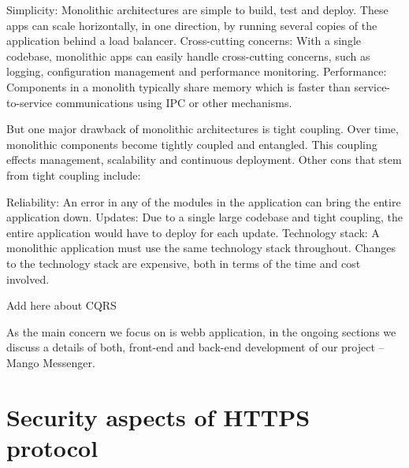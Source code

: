 Simplicity: Monolithic architectures are simple to build, test and deploy.
These apps can scale horizontally, in one direction, by running several copies of the application behind a load balancer.
Cross-cutting concerns: With a single codebase, monolithic apps can easily handle cross-cutting concerns, such as logging,
configuration management and performance monitoring.
Performance: Components in a monolith typically share memory which is faster than service-to-service communications using IPC or other mechanisms.

But one major drawback of monolithic architectures is tight coupling.
Over time, monolithic components become tightly coupled and entangled.
This coupling effects management, scalability and continuous deployment.
Other cons that stem from tight coupling include:

Reliability: An error in any of the modules in the application can bring the entire application down.
Updates: Due to a single large codebase and tight coupling, the entire application would have to deploy for each update.
Technology stack: A monolithic application must use the same technology stack throughout.
Changes to the technology stack are expensive, both in terms of the time and cost involved.

Add here about CQRS

As the main concern we focus on is webb application, in the ongoing sections we discuss a details of both, front-end and back-end
development of our project -- Mango Messenger.

\section{Security aspects of HTTPS protocol}